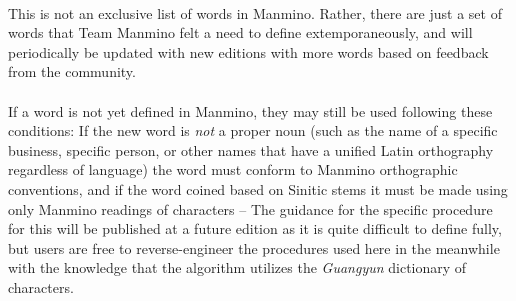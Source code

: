 \documentclass{book}
\begin{document}
\paragraph{}
This is not an exclusive list of words in Manmino. Rather, there are just a set of words that Team Manmino felt a need to define extemporaneously, and will periodically be updated with new editions with more words based on feedback from the community.

\paragraph{}
If a word is not yet defined in Manmino, they may still be used following these conditions: If the new word is \textit{not} a proper noun (such as the name of a specific business, specific person, or other names that have a unified Latin orthography regardless of language) the word must conform to Manmino orthographic conventions, and if the word coined based on Sinitic stems it must be made using only Manmino readings of characters -- The guidance for the specific procedure for this will be published at a future edition as it is quite difficult to define fully, but users are free to reverse-engineer the procedures used here in the meanwhile with the knowledge that the algorithm utilizes the \textit{Guangyun} dictionary of characters.
\end{document}
